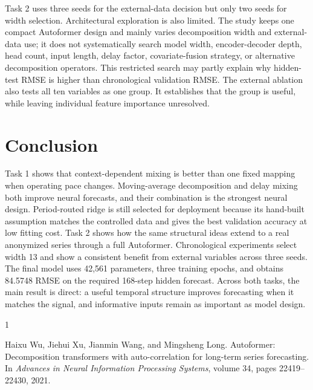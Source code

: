 \documentclass{article}
\begin{document}
Task 2 uses three seeds for the external-data decision but only two seeds for width selection. Architectural exploration is also limited. The study keeps one compact Autoformer design and mainly varies decomposition width and external-data use; it does not systematically search model width, encoder-decoder depth, head count, input length, delay factor, covariate-fusion strategy, or alternative decomposition operators. This restricted search may partly explain why hidden-test RMSE is higher than chronological validation RMSE. The external ablation also tests all ten variables as one group. It establishes that the group is useful, while leaving individual feature importance unresolved.

\section{Conclusion}

Task 1 shows that context-dependent mixing is better than one fixed mapping when operating pace changes. Moving-average decomposition and delay mixing both improve neural forecasts, and their combination is the strongest neural design. Period-routed ridge is still selected for deployment because its hand-built assumption matches the controlled data and gives the best validation accuracy at low fitting cost. Task 2 shows how the same structural ideas extend to a real anonymized series through a full Autoformer. Chronological experiments select width 13 and show a consistent benefit from external variables across three seeds. The final model uses 42,561 parameters, three training epochs, and obtains 84.5748 RMSE on the required 168-step hidden forecast. Across both tasks, the main result is direct: a useful temporal structure improves forecasting when it matches the signal, and informative inputs remain as important as model design.

\begin{thebibliography}{1}

Haixu Wu, Jiehui Xu, Jianmin Wang, and Mingsheng Long.
\newblock Autoformer: Decomposition transformers with auto-correlation for long-term series forecasting.
\newblock In \emph{Advances in Neural Information Processing Systems}, volume 34, pages 22419--22430, 2021.

\end{thebibliography}
\end{document}
